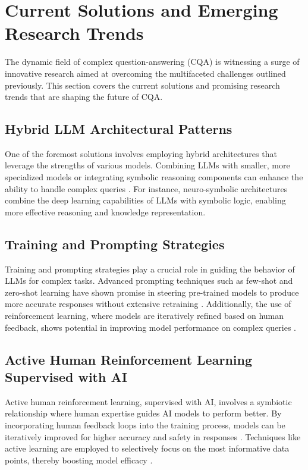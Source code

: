 \documentclass[12pt]{article}
\begin{document}
\section{Current Solutions and Emerging Research Trends}
The dynamic field of complex question-answering (CQA) is witnessing a surge of innovative research aimed at overcoming the multifaceted challenges outlined previously. This section covers the current solutions and promising research trends that are shaping the future of CQA.

\subsection{Hybrid LLM Architectural Patterns}
One of the foremost solutions involves employing hybrid architectures that leverage the strengths of various models. Combining LLMs with smaller, more specialized models or integrating symbolic reasoning components can enhance the ability to handle complex queries \cite{journaillina}. For instance, neuro-symbolic architectures combine the deep learning capabilities of LLMs with symbolic logic, enabling more effective reasoning and knowledge representation.

\subsection{Training and Prompting Strategies}
Training and prompting strategies play a crucial role in guiding the behavior of LLMs for complex tasks. Advanced prompting techniques such as few-shot and zero-shot learning have shown promise in steering pre-trained models to produce more accurate responses without extensive retraining \cite{journaldong}. Additionally, the use of reinforcement learning, where models are iteratively refined based on human feedback, shows potential in improving model performance on complex queries \cite{journalleike}.

\subsection{Active Human Reinforcement Learning Supervised with AI}
Active human reinforcement learning, supervised with AI, involves a symbiotic relationship where human expertise guides AI models to perform better. By incorporating human feedback loops into the training process, models can be iteratively improved for higher accuracy and safety in responses \cite{journaltarau}. Techniques like active learning are employed to selectively focus on the most informative data points, thereby boosting model efficacy \cite{journalsettles}.
\end{document}
